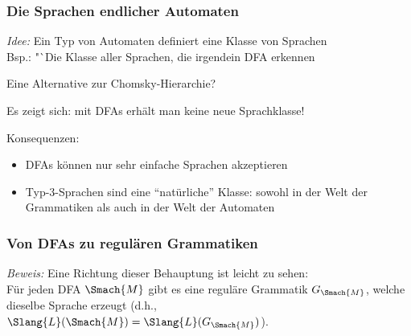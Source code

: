 \documentclass[aspectratio=1610,onlymath]{beamer}
\begin{document}
\begin{frame}

\end{frame}

\begin{frame}\frametitle{Die Sprachen endlicher Automaten}

\emph{Idee:} Ein Typ von Automaten definiert eine Klasse von Sprachen\\
Bsp.: "`Die Klasse aller Sprachen, die irgendein DFA erkennen 
\bigskip

\alert{Eine Alternative zur Chomsky-Hierarchie?}
\smallskip\pause

Es zeigt sich: mit DFAs erhält man keine neue Sprachklasse!
\medskip


Konsequenzen:
\begin{itemize}
\item DFAs können nur sehr einfache Sprachen akzeptieren
\item Typ-3-Sprachen sind eine "`natürliche"' Klasse: sowohl in der Welt der Grammatiken als auch in der Welt der Automaten
\end{itemize}



\end{frame}

\begin{frame}\frametitle{Von DFAs zu regulären Grammatiken}


\emph{Beweis:} Eine Richtung dieser Behauptung ist leicht zu sehen:\\[0.5ex]
Für jeden DFA $\Smach{M}$ gibt es eine reguläre Grammatik $G_{\Smach{M}}$, welche dieselbe Sprache erzeugt (d.h., $\Slang{L}(\Smach{M})=\Slang{L}(G_{\Smach{M}})$).\smallskip\pause


\end{frame}
\end{document}
